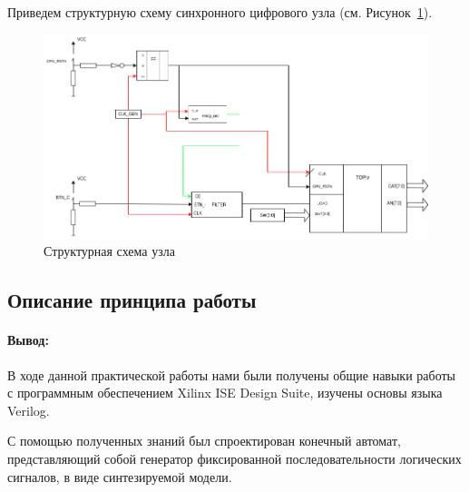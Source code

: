 \documentclass[a4paper,14pt]{extarticle}
\begin{document}
Приведем структурную схему синхронного цифрового узла (см. Рисунок~\ref{fig:unit-pract3}).

\begin{figure}[h!]
	\centering
	\includegraphics[width=0.8\linewidth]{images/unit-pract3}
	\caption{Структурная схема узла}
	\label{fig:unit-pract3}
\end{figure}


\subsection*{Описание принципа работы}



\paragraph{Вывод: }
В ходе данной практической работы нами были получены общие навыки работы с программным обеспечением Xilinx ISE Design Suite, изучены основы языка Verilog.

С помощью полученных знаний был спроектирован конечный автомат, представляющий собой генератор
фиксированной последовательности логических сигналов, в виде синтезируемой модели.
\end{document}
